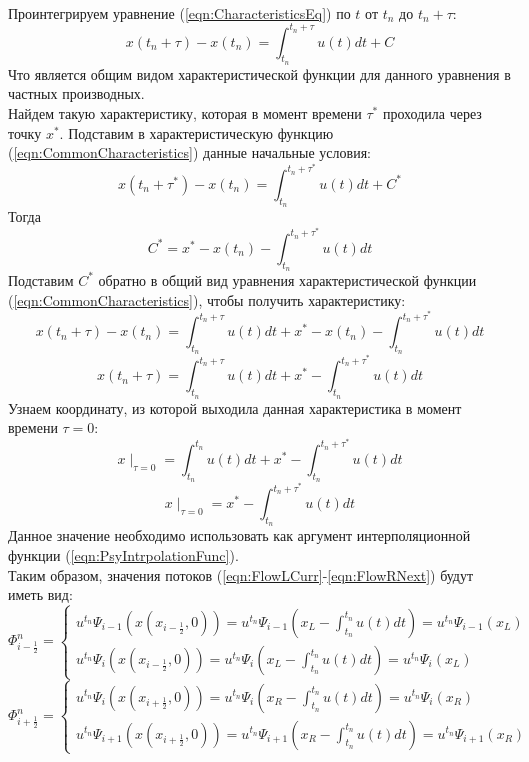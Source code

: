 \documentclass[10pt,a4paper]{article}
\begin{document}
\\Проинтегрируем уравнение (\ref{eqn:CharacteristicsEq}) по $t$ от $t_n$ до $t_n+\tau$:
\begin{equation}
\label{eqn:CommonCharacteristics}
x(t_n+\tau)-x(t_n)=\int_{t_n}^{t_n+\tau}u(t)dt + C
\end{equation}
Что является общим видом характеристической функции для данного уравнения в частных производных.
\\Найдем такую характеристику, которая в момент времени $\tau^*$ проходила через точку $x^*$. Подставим в характеристическую функцию (\ref{eqn:CommonCharacteristics}) данные начальные условия:
\[
x(t_n+\tau^*)-x(t_n)=\int_{t_n}^{t_n+\tau^*}u(t)dt + C^*
\]
Тогда
\[
C^* = x^*-x(t_n)-\int_{t_n}^{t_n+\tau^*}u(t)dt
\]
Подставим $C^*$ обратно в общий вид уравнения характеристической функции (\ref{eqn:CommonCharacteristics}), чтобы получить характеристику:
\[
x(t_n+\tau)-x(t_n)=\int_{t_n}^{t_n+\tau}u(t)dt + x^*-x(t_n)-\int_{t_n}^{t_n+\tau^*}u(t)dt
\]
\begin{equation}
\label{eqn:Characteristic}
x(t_n+\tau)=\int_{t_n}^{t_n+\tau}u(t)dt + x^*-\int_{t_n}^{t_n+\tau^*}u(t)dt
\end{equation}
Узнаем координату, из которой выходила данная характеристика в момент времени $\tau=0$:
\[
x\mid_{\tau=0}=\int_{t_n}^{t_n}u(t)dt + x^*-\int_{t_n}^{t_n+\tau^*}u(t)dt
\]
\begin{equation}
\label{eqn:CharacteristicFromZero}
x\mid_{\tau=0}=x^*-\int_{t_n}^{t_n+\tau^*}u(t)dt
\end{equation}
Данное значение необходимо использовать как аргумент интерполяционной функции (\ref{eqn:PsyIntrpolationFunc}).
\\Таким образом, значения потоков (\ref{eqn:FlowLCurr}-\ref{eqn:FlowRNext}) будут иметь вид:
\begin{equation}
\label{eqn:FlowLCurrXSubst}
\Phi_{i-\frac{1}{2}}^n=\begin{cases}
u^{t_n} \Psi_{i-1}(x(x_{i-\frac{1}{2}}, 0))=
u^{t_n}\Psi_{i-1}(x_L-\int_{t_n}^{t_n}u(t)dt)=u^{t_n}\Psi_{i-1}(x_L)

\\
u^{t_n} \Psi_{i}(x(x_{i-\frac{1}{2}}, 0))=
u^{t_n}\Psi_{i}(x_L-\int_{t_n}^{t_n}u(t)dt)=u^{t_n}\Psi_{i}(x_L)

\end{cases}
\end{equation}
\begin{equation}
\label{eqn:FlowRCurrXSubst}
\Phi_{i+\frac{1}{2}}^n=\begin{cases}
u^{t_n} \Psi_{i}(x(x_{i+\frac{1}{2}}, 0))=
u^{t_n} \Psi_{i}(x_R-\int_{t_n}^{t_n}u(t)dt)=u^{t_n}\Psi_{i}(x_R)

\\
u^{t_n} \Psi_{i+1}(x(x_{i+\frac{1}{2}}, 0))=
u^{t_n} \Psi_{i+1}(x_R-\int_{t_n}^{t_n}u(t)dt)=u^{t_n}\Psi_{i+1}(x_R)

\end{cases}
\end{equation}
\end{document}
